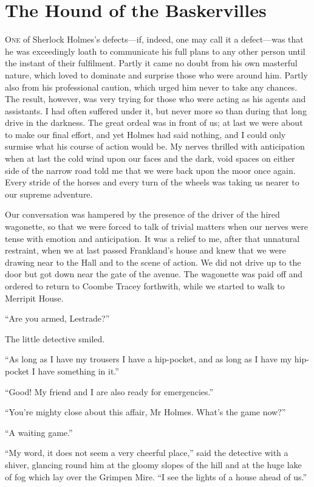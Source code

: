 \documentclass[paper=5.5in:8.5in,BCOR=7mm,twoside,DIV=calc,12pt,usegeometry,openany,chapterprefix,endperiod,headings=big]{scrbook} %
\begin{document}
\chapter{The Hound of the Baskervilles}
\lettrine[lines=1]{O}{ne} of Sherlock Holmes's defects---if, indeed, one may call it a defect---was that he was exceedingly loath to communicate his full plans to any other person until the instant of their fulfilment. Partly it came no doubt from his own masterful nature, which loved to dominate and surprise those who were around him. Partly also from his professional caution, which urged him never to take any chances. The result, however, was very trying for those who were acting as his agents and assistants. I had often suffered under it, but never more so than during that long drive in the darkness. The great ordeal was in front of us; at last we were about to make our final effort, and yet Holmes had said nothing, and I could only surmise what his course of action would be. My nerves thrilled with anticipation when at last the cold wind upon our faces and the dark, void spaces on either side of the narrow road told me that we were back upon the moor once again. Every stride of the horses and every turn of the wheels was taking us nearer to our supreme adventure.

Our conversation was hampered by the presence of the driver of the hired wagonette, so that we were forced to talk of trivial matters when our nerves were tense with emotion and anticipation. It was a relief to me, after that unnatural restraint, when we at last passed Frankland's house and knew that we were drawing near to the Hall and to the scene of action. We did not drive up to the door but got down near the gate of the avenue. The wagonette was paid off and ordered to return to Coombe Tracey forthwith, while we started to walk to Merripit House.

\enquote{Are you armed, Lestrade?}

The little detective smiled.

\enquote{As long as I have my trousers I have a hip-pocket, and as long as I have my hip-pocket I have something in it.}

\enquote{Good! My friend and I are also ready for emergencies.}

\enquote{You're mighty close about this affair, Mr Holmes. What's the game now?}

\enquote{A waiting game.}

\enquote{My word, it does not seem a very cheerful place,} said the detective with a shiver, glancing round him at the gloomy slopes of the hill and at the huge lake of fog which lay over the Grimpen Mire. \enquote{I see the lights of a house ahead of us.}
\end{document}
